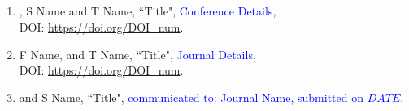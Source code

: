 \subsection*{}
\begin{enumerate}
		\item \textbf{\scholar}, S Name and T Name, ``Title", \textcolor{blue}{Conference Details},\\ 
		DOI: \url{https://doi.org/DOI_num}.
		
		\item F Name, \textbf{\scholar} and T Name, ``Title", \textcolor{blue}{Journal Details},\\ 
		DOI: \url{https://doi.org/DOI_num}.
		
		\item \textbf{\scholar} and S Name, ``Title",
		\textcolor{blue}{communicated to: Journal Name, submitted on  $DATE$.}
\end{enumerate}
	

\newpage
\subsection*{}
\lipsum[3-4]
\newpage

\subsection*{}

% 

\cleardoublepage











